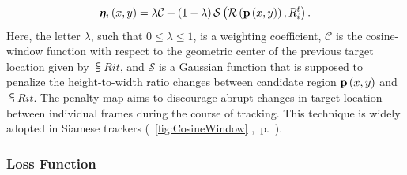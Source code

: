 \begin{equation}
    {\bm{\eta}_{i}} \left( x, y \right) =
    \lambda \mathcal{C} +
    \left( {1 - \lambda} \right) {\mathcal{S}} \left( 
        {\mathcal{R}} \left( 
            {\mathbf{p}} \left( x, y \right)
         \right),
        {R}_{i}^{t}
     \right).
\end{equation}
Here, the letter $\lambda$, such that $0 \leq \lambda \leq 1$, is a weighting coefficient, $\mathcal{C}$ is the cosine-window function with respect to the geometric center of the previous target location given by $\subsup{R}{i}{t}$, and $\mathcal{S}$ is a Gaussian function that is supposed to penalize the height-to-width ratio changes between candidate region ${\mathbf{p}} \left( x, y \right)$ and $\subsup{R}{i}{t}$. The penalty map aims to discourage abrupt changes in target location between individual frames during the course of tracking. This technique is widely adopted in Siamese trackers (\figtext{}~\ref{fig:CosineWindow} ,~p.~\pageref{fig:CosineWindow}).

\subsubsection{Loss Function}

